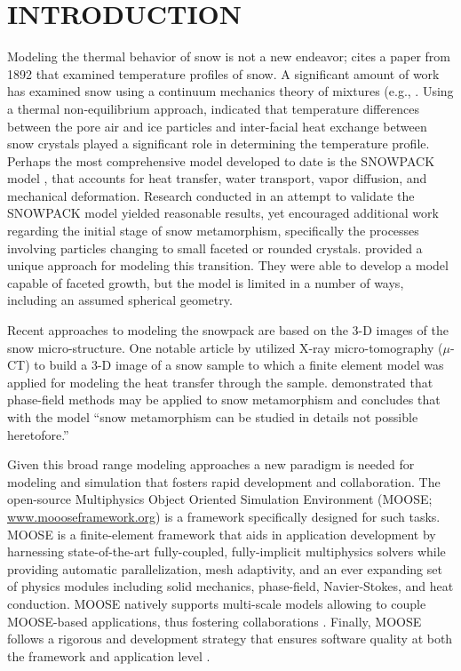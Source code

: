 \section{INTRODUCTION}
Modeling the thermal behavior of snow is not a new endeavor; \citet{lachapelle1960critique} cites a paper from 1892 that examined temperature profiles of snow. A significant amount of work has examined snow using a continuum mechanics theory of mixtures (e.g., \citet{adams1989constitutive, brown1999mixture}.  Using a thermal non-equilibrium approach, \citet{bartelt2004} indicated that temperature differences between the pore air and ice particles and inter-facial heat exchange between snow crystals played a significant role in determining the temperature profile. Perhaps the most comprehensive model developed to date is the SNOWPACK model \citep{bartelt2002physical, lehning2002physical, lehning2002physicalb}, that accounts for heat transfer, water transport, vapor diffusion, and mechanical deformation.  Research conducted in an attempt to validate the SNOWPACK model yielded reasonable results, yet \citet{fierz2001assessment} encouraged additional work regarding the initial stage of snow metamorphism, specifically the processes involving particles changing to small faceted or rounded crystals. \citet{miller2009microstructural} provided a unique approach for modeling this transition. They were able to develop a model capable of faceted growth, but the model is limited in a number of ways, including an assumed spherical geometry.

Recent approaches to modeling the snowpack are based on the 3-D images of the snow micro-structure.  One notable article by \citet{kaempfer2005microstructural} utilized X-ray micro-tomography ($\mu$-CT) to build a 3-D image of a snow sample to which a finite element model was applied for modeling the heat transfer through the sample. \citet{kaempfer2009phase} demonstrated that phase-field methods may be applied to snow metamorphism and concludes that with the model ``snow metamorphism can be studied in details not possible heretofore.''

Given this broad range modeling approaches a new paradigm is needed for modeling and simulation that fosters rapid development and collaboration. The open-source Multiphysics Object Oriented Simulation Environment (MOOSE; \url{www.moooseframework.org}) is a framework specifically designed for such tasks. MOOSE is a finite-element framework that aids in application development by harnessing state-of-the-art fully-coupled, fully-implicit multiphysics solvers while providing automatic parallelization, mesh adaptivity, and an ever expanding set of physics modules including solid mechanics, phase-field, Navier-Stokes, and heat conduction. MOOSE natively supports multi-scale models allowing to couple MOOSE-based applications, thus fostering collaborations \citep{gaston2014physics}. Finally, MOOSE follows a rigorous and development strategy that ensures software quality at both the framework and application level \citep{gaston2014continous}.

